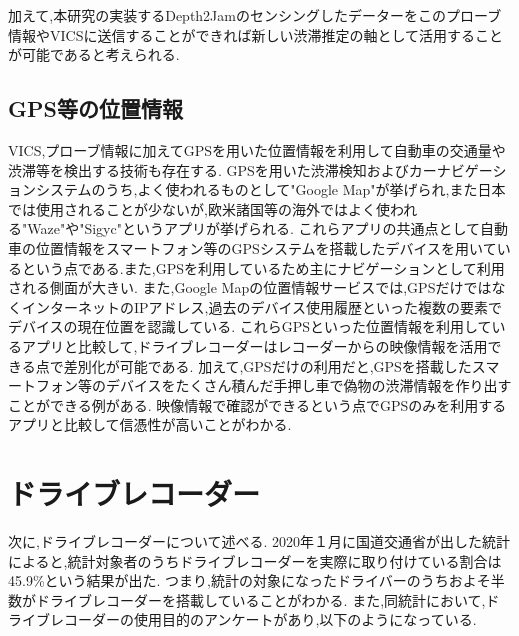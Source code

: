 加えて,本研究の実装するDepth2Jamのセンシングしたデーターをこのプローブ情報やVICSに送信することができれば新しい渋滞推定の軸として活用することが可能であると考えられる.

\newpage

%
%

\subsection{GPS等の位置情報}
VICS,プローブ情報に加えてGPSを用いた位置情報を利用して自動車の交通量や渋滞等を検出する技術も存在する.
GPSを用いた渋滞検知およびカーナビゲーションシステムのうち,よく使われるものとして"Google Map"が挙げられ,また日本では使用されることが少ないが,欧米諸国等の海外ではよく使われる"Waze"\cite{Waze}や"Sigyc"\cite{Sigyc}というアプリが挙げられる.
これらアプリの共通点として自動車の位置情報をスマートフォン等のGPSシステムを搭載したデバイスを用いているという点である.また,GPSを利用しているため主にナビゲーションとして利用される側面が大きい.
また,Google Mapの位置情報サービスでは,GPSだけではなくインターネットのIPアドレス,過去のデバイス使用履歴といった複数の要素でデバイスの現在位置を認識している.\cite{google_map}
これらGPSといった位置情報を利用しているアプリと比較して,ドライブレコーダーはレコーダーからの映像情報を活用できる点で差別化が可能である.
加えて,GPSだけの利用だと,GPSを搭載したスマートフォン等のデバイスをたくさん積んだ手押し車で偽物の渋滞情報を作り出すことができる例がある.\cite{create_jam}
映像情報で確認ができるという点でGPSのみを利用するアプリと比較して信憑性が高いことがわかる.

\newpage
\section{ドライブレコーダー}
次に,ドライブレコーダーについて述べる.
2020年１月に国道交通省が出した統計\cite{ministryofland}によると,統計対象者のうちドライブレコーダーを実際に取り付けている割合は45.9\%という結果が出た.
つまり,統計の対象になったドライバーのうちおよそ半数がドライブレコーダーを搭載していることがわかる.
また,同統計において,ドライブレコーダーの使用目的のアンケートがあり,以下のようになっている.

